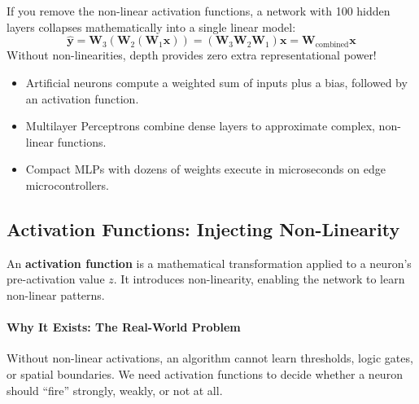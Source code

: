 \begin{warning}
If you remove the non-linear activation functions, a network with 100 hidden layers collapses mathematically into a single linear model:
\begin{equation*}
\hat{\mathbf{y}} = \mathbf{W}_3 (\mathbf{W}_2 (\mathbf{W}_1 \mathbf{x})) = (\mathbf{W}_3 \mathbf{W}_2 \mathbf{W}_1) \mathbf{x} = \mathbf{W}_{\text{combined}} \mathbf{x}
\end{equation*}
Without non-linearities, depth provides zero extra representational power!
\end{warning}

\begin{takeaways}
\begin{itemize}
    \item Artificial neurons compute a weighted sum of inputs plus a bias, followed by an activation function.
    \item Multilayer Perceptrons combine dense layers to approximate complex, non-linear functions.
    \item Compact MLPs with dozens of weights execute in microseconds on edge microcontrollers.
\end{itemize}
\end{takeaways}

\subsection{Activation Functions: Injecting Non-Linearity}

\begin{keyidea}
An \textbf{activation function} is a mathematical transformation applied to a neuron's pre-activation value $z$. It introduces non-linearity, enabling the network to learn non-linear patterns.
\end{keyidea}

\paragraph{Why It Exists: The Real-World Problem}
Without non-linear activations, an algorithm cannot learn thresholds, logic gates, or spatial boundaries. We need activation functions to decide whether a neuron should ``fire'' strongly, weakly, or not at all.

